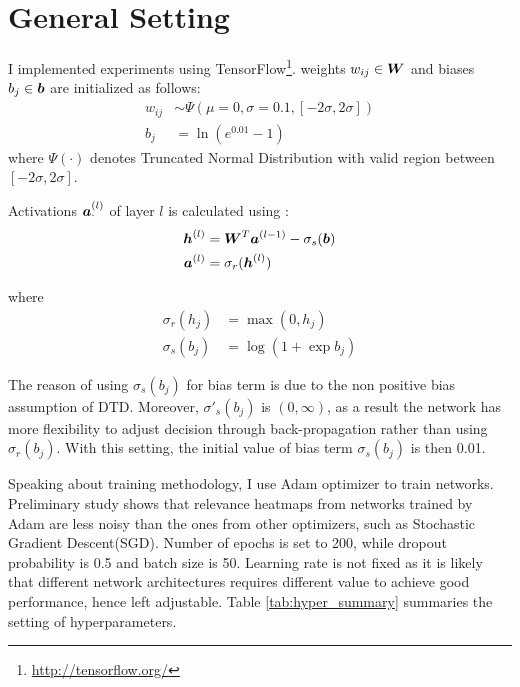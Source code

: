 \section{General Setting}\label{sec:setup}
 
 I implemented experiments using TensorFlow\footnote{\url{http://tensorflow.org/}}.  weights $w_{ij} \in \patmatrix{W}$ and biases $b_{j} \in \patvector{b}$ are initialized as follows:
\begin{align*}
	w_{ij} &\sim \Psi( \mu=0, \sigma =0.1, [-2\sigma, 2\sigma]) \\
	b_{j} &= \ln(e^{0.01} - 1)
\end{align*}
where $\Psi(\cdot)$ denotes Truncated Normal Distribution with valid region between $[-2\sigma, 2\sigma]$.


Activations $\patvector{a}^{(l)}_\cdot$ of layer $l$ is calculated using :
\begin{align*}
	\patvector{h}^{(l)}  &=  	\patmatrix{W}^T \patvector{a}^{(l-1)} - \sigma_{s}(\patvector{b}) \\
	\patvector{a}^{(l)}  &=  	\sigma_{r} (	\patvector{h}^{(l)} )
\end{align*}

where
\begin{align*}
	\sigma_{r} (h_j) &= \max(0, h_j)  \tag{ReLU function}\\
	\sigma_{s} (b_j) &= \log(1+\exp b_j) \tag{Softplus function}
\end{align*}

The reason of using $\sigma_{s} (b_j)$ for bias term is due to the non positive bias assumption of DTD. Moreover, $\sigma'_{s} (b_j)$ is $(0, \infty)$, as a result the network has more flexibility to adjust decision through back-propagation rather than using $\sigma_{r} (b_j)$. With this setting, the initial value of bias term  $\sigma_{s}(b_j)$ is then 0.01.

Speaking about training methodology, I use Adam\cite{KingmaAdamMethodStochastic2014} optimizer to train networks. Preliminary study shows that relevance heatmaps from networks trained by Adam are less noisy than the ones from other optimizers, such as  Stochastic Gradient Descent(SGD). Number of epochs is set to 200, while dropout probability is 0.5 and batch size is 50.  
Learning rate is not fixed as it is likely that different network architectures requires different value to achieve good performance, hence left adjustable. Table \ref{tab:hyper_summary} summaries the setting of hyperparameters.


